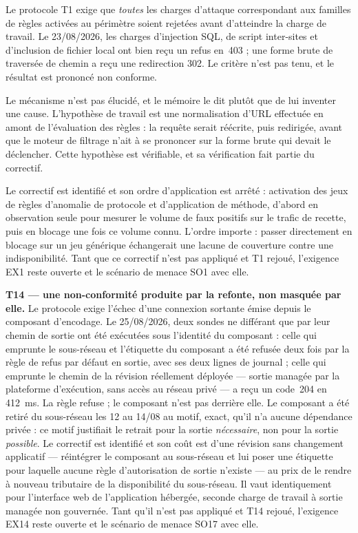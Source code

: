Le protocole T1 exige que \emph{toutes} les charges d'attaque correspondant aux familles de
règles activées au périmètre soient rejetées avant d'atteindre la charge de travail. Le
23/08/2026, les charges d'injection SQL, de script inter-sites et d'inclusion de fichier local
ont bien reçu un refus en~403 ; une forme brute de traversée de chemin a reçu une redirection
302. Le critère n'est pas tenu, et le résultat est prononcé non conforme.

Le mécanisme n'est pas élucidé, et le mémoire le dit plutôt que de lui inventer une cause.
L'hypothèse de travail est une normalisation d'URL effectuée en amont de l'évaluation des règles :
la requête serait réécrite, puis redirigée, avant que le moteur de filtrage n'ait à se prononcer
sur la forme brute qui devait le déclencher. Cette hypothèse est vérifiable, et sa vérification
fait partie du correctif.

Le correctif est identifié et son ordre d'application est arrêté : activation des jeux de règles
d'anomalie de protocole et d'application de méthode, d'abord en observation seule pour mesurer le
volume de faux positifs sur le trafic de recette, puis en blocage une fois ce volume connu.
L'ordre importe : passer directement en blocage sur un jeu générique échangerait une lacune de
couverture contre une indisponibilité. Tant que ce correctif n'est pas appliqué et T1 rejoué,
l'exigence EX1 reste ouverte et le scénario de menace SO1 avec elle.

\textbf{T14 --- une non-conformité produite par la refonte, non masquée par elle.} Le protocole
exige l'échec d'une connexion sortante émise depuis le composant d'encodage. Le 25/08/2026, deux
sondes ne différant que par leur chemin de sortie ont été exécutées sous l'identité du composant :
celle qui emprunte le sous-réseau et l'étiquette du composant a été refusée deux fois par la règle
de refus par défaut en sortie, avec ses deux lignes de journal ; celle qui emprunte le chemin de la
révision réellement déployée --- sortie managée par la plateforme d'exécution, sans accès au réseau
privé --- a reçu un code~204 en 412~ms. La règle refuse ; le composant n'est pas derrière elle.
Le composant a été retiré du sous-réseau les 12 au 14/08 au motif, exact, qu'il n'a aucune
dépendance privée : ce motif justifiait le retrait pour la sortie \emph{nécessaire}, non pour la
sortie \emph{possible}. Le correctif est identifié et son coût est d'une révision sans changement
applicatif --- réintégrer le composant au sous-réseau et lui poser une étiquette pour laquelle
aucune règle d'autorisation de sortie n'existe --- au prix de le rendre à nouveau tributaire de la
disponibilité du sous-réseau. Il vaut identiquement pour l'interface web de l'application hébergée,
seconde charge de travail à sortie managée non gouvernée. Tant qu'il n'est pas appliqué et T14
rejoué, l'exigence EX14 reste ouverte et le scénario de menace SO17 avec elle.

